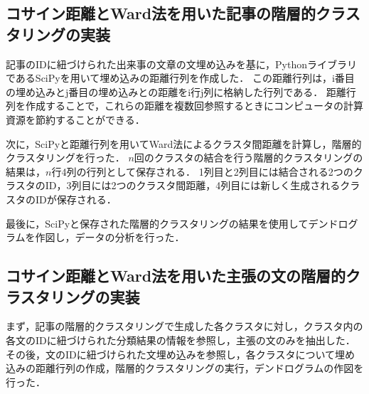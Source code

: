 \documentclass[12pt,a4j]{jreport}
\begin{document}



\subsection{コサイン距離とWard法を用いた記事の階層的クラスタリングの実装}
記事のIDに紐づけられた出来事の文章の文埋め込みを基に，PythonライブラリであるSciPyを用いて埋め込みの距離行列を作成した．
この距離行列は，i番目の埋め込みとj番目の埋め込みとの距離をi行j列に格納した行列である．
距離行列を作成することで，これらの距離を複数回参照するときにコンピュータの計算資源を節約することができる．

次に，SciPyと距離行列を用いてWard法によるクラスタ間距離を計算し，階層的クラスタリングを行った．
$n$回のクラスタの結合を行う階層的クラスタリングの結果は，$n$行4列の行列として保存される．
1列目と2列目には結合される2つのクラスタのID，3列目には2つのクラスタ間距離，4列目には新しく生成されるクラスタのIDが保存される．

最後に，SciPyと保存された階層的クラスタリングの結果を使用してデンドログラムを作図し，データの分析を行った．


\subsection{コサイン距離とWard法を用いた主張の文の階層的クラスタリングの実装}
まず，記事の階層的クラスタリングで生成した各クラスタに対し，クラスタ内の各文のIDに紐づけられた分類結果の情報を参照し，主張の文のみを抽出した．
その後，文のIDに紐づけられた文埋め込みを参照し，各クラスタについて埋め込みの距離行列の作成，階層的クラスタリングの実行，デンドログラムの作図を行った．
\end{document}
